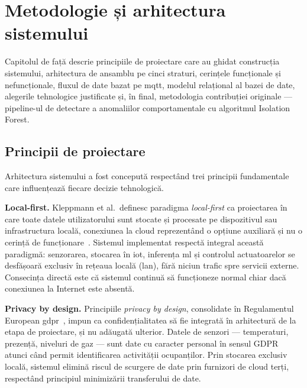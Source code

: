 \chapter{Metodologie și arhitectura sistemului}
\label{ch:metodologie}

Capitolul de față descrie principiile de proiectare care au ghidat construcția sistemului,
arhitectura de ansamblu pe cinci straturi, cerințele funcționale și nefuncționale, fluxul
de date bazat pe \gls{mqtt}, modelul relațional al bazei de date, alegerile tehnologice
justificate și, în final, metodologia contribuției originale — pipeline-ul de detectare
a anomaliilor comportamentale cu algoritmul Isolation Forest.

\section{Principii de proiectare}
\label{sec:principii}

Arhitectura sistemului a fost concepută respectând trei principii fundamentale care
influențează fiecare decizie tehnologică.

\textbf{Local-first.} Kleppmann et al.\ definesc paradigma \emph{local-first} ca
proiectarea în care toate datele utilizatorului sunt stocate și procesate pe dispozitivul
sau infrastructura locală, conexiunea la cloud reprezentând o opțiune auxiliară și nu o
cerință de funcționare~\cite{kleppmann2019localfirst}. Sistemul implementat respectă
integral această paradigmă: senzorarea, stocarea în \gls{iot}, inferența \gls{ml} și
controlul actuatoarelor se desfășoară exclusiv în rețeaua locală (\gls{lan}), fără niciun
trafic spre servicii externe. Consecința directă este că sistemul continuă să funcționeze
normal chiar dacă conexiunea la Internet este absentă.

\textbf{Privacy by design.} Principiile \emph{privacy by design}, consolidate în
Regulamentul European \gls{gdpr}~\cite{gdpr2016}, impun ca confidențialitatea să fie
integrată în arhitectură de la etapa de proiectare, și nu adăugată ulterior. Datele de
senzori — temperaturi, prezență, niveluri de gaz — sunt date cu caracter personal în
sensul GDPR atunci când permit identificarea activității ocupanților. Prin stocarea
exclusiv locală, sistemul elimină riscul de scurgere de date prin furnizori de cloud
terți, respectând principiul minimizării transferului de date.

